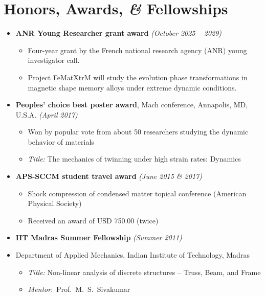 \documentclass[a4paper,10pt, oneside]{article}
\begin{document}
	\section*{{Honors, Awards, \emph{\&} Fellowships}}
	\begin{itemize}[wide, labelwidth=!, labelindent=-1em]
		\item[]\textbf{ANR Young Researcher grant award} \hfill \textit{(October 2025 -- 2029)}
		\begin{itemize}[wide, labelwidth=!, labelindent=0em]
			\item Four-year grant by the French national research agency (ANR) young investigator call. 
			\item Project FeMatXtrM will study the evolution phase transformations in magnetic shape memory alloys under extreme dynamic conditions.
		\end{itemize} 
		\item[]\textbf{Peoples' choice best poster award}, Mach conference, Annapolis, MD, U.S.A. \hfill \textit{(April 2017)}
		\begin{itemize}[wide, labelwidth=!, labelindent=0em]
			\item Won by popular vote from about 50 researchers studying the dynamic behavior of materials
			\item \textit{Title:} The mechanics of twinning under high strain rates: Dynamics
		\end{itemize} 
		\vspace*{0.5em}
		\item[]\textbf{APS-SCCM student travel award} \hfill \textit{(June 2015 {\&} 2017)}
		\begin{itemize}[leftmargin=*]
			\item Shock compression of condensed matter topical conference (American Physical Society)
			\item Received an award of USD 750.00 (twice)
		\end{itemize}
		\vspace*{0.5em}
		\item[]\textbf{IIT Madras Summer Fellowship} \hfill \textit{(Summer 2011)}
		\item[]Department of Applied Mechanics, Indian Institute of Technology, Madras
		\begin{itemize}[wide, labelwidth=!, labelindent=0em]
			\item \textit{Title: }Non-linear analysis of discrete structures -- Truss, Beam, and Frame
			\item \textit{Mentor}:~Prof.~M.~S.~Sivakumar
		\end{itemize}
	\end{itemize}
	
\end{document}
